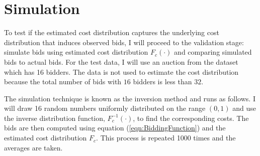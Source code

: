 \documentclass[11pt]{article}
\begin{document}
\section[title]{Simulation} 
To test if the estimated cost distribution captures the underlying cost 
distribution that induces observed bids, I will proceed to the validation stage: 
simulate bids using estimated cost distribution 
$F_c(\cdot)$ and comparing simulated bids to actual bids. For the test data, 
I will use an auction from the dataset which has 16 bidders. The data is not used 
to estimate the cost distribution because the total number of bids with 
$16$ bidders is less than $32$. 

The simulation technique is known as the inversion method and runs as follows.
I will draw 16 random numbers uniformly 
distributed on the range $(0 ,1)$ and use the inverse distribution function, 
$F_c^{-1}(\cdot)$, to find the corresponding costs. The bids are then computed 
using equation (\ref{eqn:BiddingFunction}) and the estimated cost distribution 
$F_c$. This process is repeated 1000 times and the averages are taken. 
\end{document}
